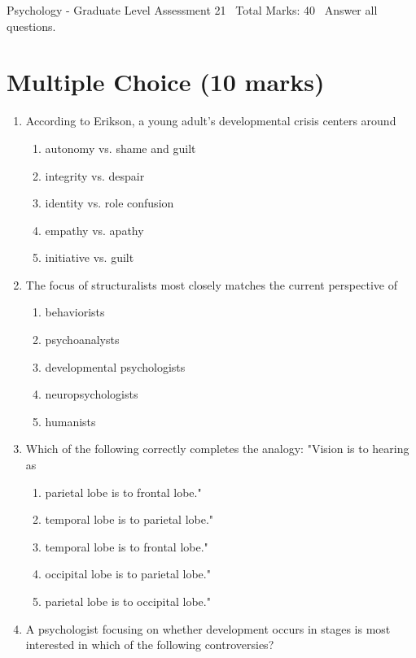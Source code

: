 \documentclass[12pt]{article}
\begin{document}
\begin{center}
Psychology - Graduate Level Assessment 21 \
Total Marks: 40 \
Answer all questions.
\end{center}

\section*{Multiple Choice (10 marks)}
\begin{enumerate}[label=\arabic*.]
\item According to Erikson, a young adult's developmental crisis centers around
\begin{enumerate}[label=(\alph*)]
    \item autonomy vs. shame and guilt
    \item integrity vs. despair
    \item identity vs. role confusion
    \item empathy vs. apathy
    \item initiative vs. guilt
\end{enumerate}
\item The focus of structuralists most closely matches the current perspective of
\begin{enumerate}[label=(\alph*)]
    \item behaviorists
    \item psychoanalysts
    \item developmental psychologists
    \item neuropsychologists
    \item humanists
\end{enumerate}
\item Which of the following correctly completes the analogy: "Vision is to hearing as
\begin{enumerate}[label=(\alph*)]
    \item parietal lobe is to frontal lobe."
    \item temporal lobe is to parietal lobe."
    \item temporal lobe is to frontal lobe."
    \item occipital lobe is to parietal lobe."
    \item parietal lobe is to occipital lobe."
\end{enumerate}
\item A psychologist focusing on whether development occurs in stages is most interested in which of the following controversies?
\begin{enumerate}[label=(\alph*)]

\end{enumerate}
\end{enumerate}
\end{document}
